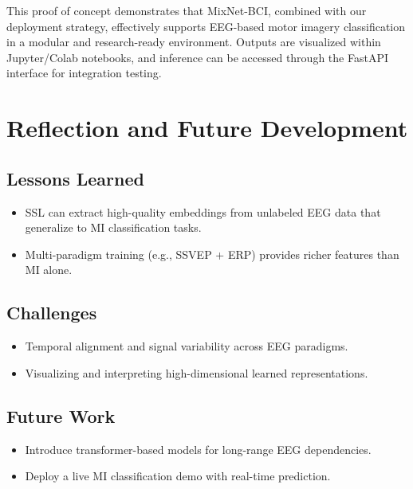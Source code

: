 This proof of concept demonstrates that MixNet-BCI, combined with our deployment strategy, effectively supports EEG-based motor imagery classification in a modular and research-ready environment.
Outputs are visualized within Jupyter/Colab notebooks, and inference can be accessed through the FastAPI interface for integration testing.


\section{Reflection and Future Development}
\label{sec:reflection}


\subsection*{Lessons Learned}
\begin{itemize}[leftmargin=3.5em]
    \item SSL can extract high-quality embeddings from unlabeled EEG data that generalize to MI classification tasks.
    \item Multi-paradigm training (e.g., SSVEP + ERP) provides richer features than MI alone.
\end{itemize}


\subsection*{Challenges}
\begin{itemize}[leftmargin=3.5em]
    \item Temporal alignment and signal variability across EEG paradigms.
    \item Visualizing and interpreting high-dimensional learned representations.
\end{itemize}

\subsection*{Future Work}
\begin{itemize}[leftmargin=3.5em]
    \item Introduce transformer-based models for long-range EEG dependencies.
    \item Deploy a live MI classification demo with real-time prediction.
\end{itemize}
